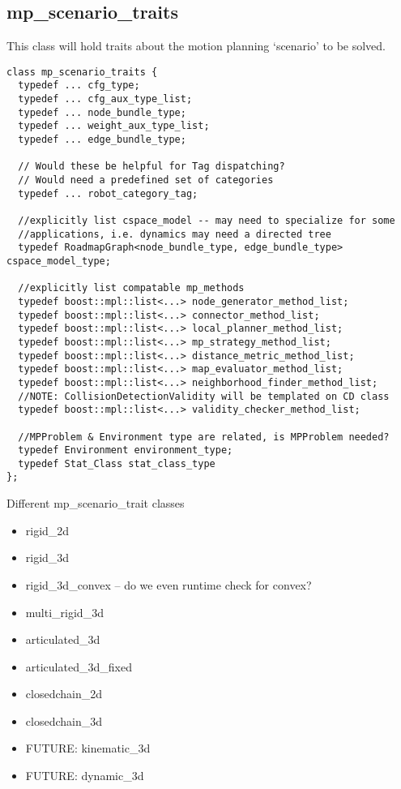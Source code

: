 \subsection{mp\_scenario\_traits}
This class will hold traits about the motion planning `scenario' to be solved.

\begin{lstlisting}
class mp_scenario_traits {
  typedef ... cfg_type;
  typedef ... cfg_aux_type_list;
  typedef ... node_bundle_type;
  typedef ... weight_aux_type_list;
  typedef ... edge_bundle_type;
  
  // Would these be helpful for Tag dispatching?
  // Would need a predefined set of categories
  typedef ... robot_category_tag;
  
  //explicitly list cspace_model -- may need to specialize for some
  //applications, i.e. dynamics may need a directed tree
  typedef RoadmapGraph<node_bundle_type, edge_bundle_type> cspace_model_type;
  
  //explicitly list compatable mp_methods
  typedef boost::mpl::list<...> node_generator_method_list;
  typedef boost::mpl::list<...> connector_method_list;
  typedef boost::mpl::list<...> local_planner_method_list;
  typedef boost::mpl::list<...> mp_strategy_method_list;
  typedef boost::mpl::list<...> distance_metric_method_list;
  typedef boost::mpl::list<...> map_evaluator_method_list;
  typedef boost::mpl::list<...> neighborhood_finder_method_list;
  //NOTE: CollisionDetectionValidity will be templated on CD class
  typedef boost::mpl::list<...> validity_checker_method_list;
  
  //MPProblem & Environment type are related, is MPProblem needed?
  typedef Environment environment_type;
  typedef Stat_Class stat_class_type
};
\end{lstlisting}
\newpage
Different mp\_scenario\_trait classes
\begin{itemize}
    \item rigid\_2d
    \item rigid\_3d
    \item rigid\_3d\_convex -- do we even runtime check for convex?
    \item multi\_rigid\_3d
    \item articulated\_3d
    \item articulated\_3d\_fixed
    \item closedchain\_2d
    \item closedchain\_3d
    \item FUTURE: kinematic\_3d
    \item FUTURE: dynamic\_3d
\end{itemize}
